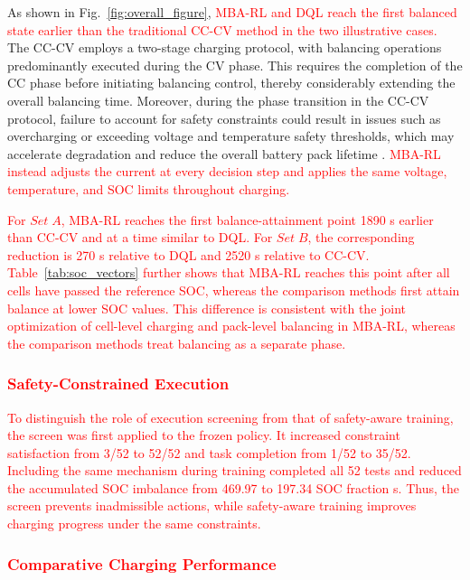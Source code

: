 \documentclass[journal]{IEEEtran}
\newcommand{\newrev}[1]{\textcolor{red}{#1}}
\begin{document}
As shown in Fig.~\ref{fig:overall_figure}, \newrev{MBA-RL and DQL reach the first balanced state earlier than the traditional CC-CV method in the two illustrative cases.} The CC-CV employs a two-stage charging protocol, with balancing operations predominantly executed during the CV phase. This requires the completion of the CC phase before initiating balancing control, thereby considerably extending the overall balancing time. Moreover, during the phase transition in the CC-CV protocol, failure to account for safety constraints could result in issues such as overcharging or exceeding voltage and temperature safety thresholds, which may accelerate degradation and reduce the overall battery pack lifetime \cite{14, 17}. \newrev{MBA-RL instead adjusts the current at every decision step and applies the same voltage, temperature, and SOC limits throughout charging.}

\newrev{For $Set\;A$, MBA-RL reaches the first balance-attainment point 1890 s earlier than CC-CV and at a time similar to DQL. For $Set\;B$, the corresponding reduction is 270 s relative to DQL and 2520 s relative to CC-CV. Table~\ref{tab:soc_vectors} further shows that MBA-RL reaches this point after all cells have passed the reference SOC, whereas the comparison methods first attain balance at lower SOC values. This difference is consistent with the joint optimization of cell-level charging and pack-level balancing in MBA-RL, whereas the comparison methods treat balancing as a separate phase.}

\subsubsection{\newrev{Safety-Constrained Execution}}

\newrev{To distinguish the role of execution screening from that of safety-aware training, the screen was first applied to the frozen policy. It increased constraint satisfaction from 3/52 to 52/52 and task completion from 1/52 to 35/52. Including the same mechanism during training completed all 52 tests and reduced the accumulated SOC imbalance from 469.97 to 197.34 SOC fraction s. Thus, the screen prevents inadmissible actions, while safety-aware training improves charging progress under the same constraints.}

\subsubsection{\newrev{Comparative Charging Performance}}
\end{document}
